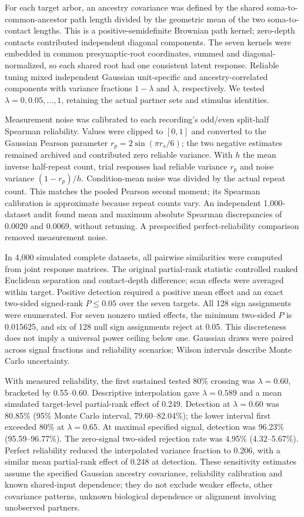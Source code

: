 For each target arbor, an ancestry covariance was defined by the shared soma-to-common-ancestor path length divided by the geometric mean of the two soma-to-contact lengths. This is a positive-semidefinite Brownian path kernel; zero-depth contacts contributed independent diagonal components. The seven kernels were embedded in common presynaptic-root coordinates, summed and diagonal-normalized, so each shared root had one consistent latent response. Reliable tuning mixed independent Gaussian unit-specific and ancestry-correlated components with variance fractions $1-\lambda$ and $\lambda$, respectively. We tested $\lambda=0,0.05,\ldots,1$, retaining the actual partner sets and stimulus identities.

Measurement noise was calibrated to each recording's odd/even split-half Spearman reliability. Values were clipped to $[0,1]$ and converted to the Gaussian Pearson parameter $r_p=2\sin(\pi r_s/6)$; the two negative estimates remained archived and contributed zero reliable variance. With $h$ the mean inverse half-repeat count, trial responses had reliable variance $r_p$ and noise variance $(1-r_p)/h$. Condition-mean noise was divided by the actual repeat count. This matches the pooled Pearson second moment; its Spearman calibration is approximate because repeat counts vary. An independent 1,000-dataset audit found mean and maximum absolute Spearman discrepancies of 0.0020 and 0.0069, without retuning. A prespecified perfect-reliability comparison removed measurement noise.

In 4,000 simulated complete datasets, all pairwise similarities were computed from joint response matrices. The original partial-rank statistic controlled ranked Euclidean separation and contact-depth difference; scan effects were averaged within target. Positive detection required a positive mean effect and an exact two-sided signed-rank $P\leq0.05$ over the seven targets. All 128 sign assignments were enumerated. For seven nonzero untied effects, the minimum two-sided $P$ is 0.015625, and six of 128 null sign assignments reject at 0.05. This discreteness does not imply a universal power ceiling below one. Gaussian draws were paired across signal fractions and reliability scenarios; Wilson intervals describe Monte Carlo uncertainty.

With measured reliability, the first sustained tested 80\% crossing was $\lambda=0.60$, bracketed by 0.55--0.60. Descriptive interpolation gave $\lambda=0.589$ and a mean simulated target-level partial-rank effect of 0.249. Detection at $\lambda=0.60$ was 80.85\% (95\% Monte Carlo interval, 79.60--82.04\%); the lower interval first exceeded 80\% at $\lambda=0.65$. At maximal specified signal, detection was 96.23\% (95.59--96.77\%). The zero-signal two-sided rejection rate was 4.95\% (4.32--5.67\%). Perfect reliability reduced the interpolated variance fraction to 0.206, with a similar mean partial-rank effect of 0.248 at detection. These sensitivity estimates assume the specified Gaussian ancestry covariance, reliability calibration and known shared-input dependence; they do not exclude weaker effects, other covariance patterns, unknown biological dependence or alignment involving unobserved partners.

